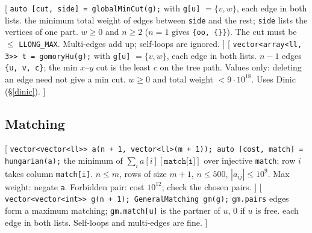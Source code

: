 [
	 \texttt{auto [cut, side] = globalMinCut(g);} with \texttt{g[u]} $= \{v, w\}$, each edge in both lists.
	 the minimum total weight of edges between \texttt{side} and the rest; \texttt{side} lists the vertices of one part.
	 $w \ge 0$ and $n \ge 2$ ($n = 1$ gives \texttt{\{oo, \{\}\}}). The cut must be $\le$ \texttt{LLONG\_MAX}. Multi-edges add up; self-loops are ignored.
]\label{stoerwagner}
[
	 \texttt{vector<array<ll, 3>> t = gomoryHu(g);} with \texttt{g[u]} $= \{v, w\}$, each edge in both lists.
	 $n - 1$ edges \texttt{\{u, v, c\}}; the min $x$--$y$ cut is the least $c$ on the tree path. Values only: deleting an edge need not give a min cut.
	 $w \ge 0$ and total weight $< 9 \cdot 10^{18}$. Uses Dinic (\S\ref{dinic}).
]\label{gomoryhu}

\subsection{Matching}
[
	 \texttt{vector<vector<ll>> a(n + 1, vector<ll>(m + 1)); auto [cost, match] = hungarian(a);}
	 the minimum of $\sum_i a[i][\texttt{match[i]}]$ over injective \texttt{match}; row $i$ takes column \texttt{match[i]}.
	 $n \le m$, rows of size $m + 1$, $n \le 500$, $|a_{ij}| \le 10^9$. Max weight: negate \texttt{a}. Forbidden pair: cost $10^{12}$; check the chosen pairs.
]\label{hungarian}
[
	 \texttt{vector<vector<int>> g(n + 1); GeneralMatching gm(g);}
	 \texttt{gm.pairs} edges form a maximum matching; \texttt{gm.match[u]} is the partner of $u$, 0 if $u$ is free.
	 each edge in both lists. Self-loops and multi-edges are fine.
]\label{blossom}
